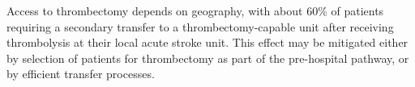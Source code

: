 Access to thrombectomy depends on geography, with about 60\% of patients requiring a secondary transfer to a thrombectomy-capable unit after receiving thrombolysis at their local acute stroke unit. This effect may be mitigated either by selection of patients for thrombectomy as part of the pre-hospital pathway, or by efficient transfer processes.